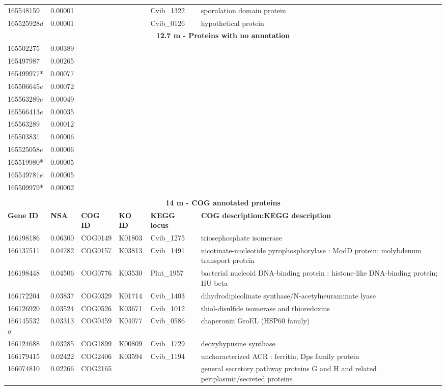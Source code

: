 \begin{landscape}
\begin{longtable}{p{1.6cm}p{1.2cm}p{1.5cm}p{1.5cm}p{2.8cm}p{13.5cm}}
165548159&0.00001&&&Cvib\_1322&sporulation domain protein \\
165525928$d$&0.00001&&&Cvib\_0126&hypothetical protein \\
\multicolumn{6}{c}{\textbf{12.7 m - Proteins with no annotation}} \\
165502275&0.00389&&&& \\
165497987&0.00265&&&& \\
165499977*&0.00077&&&& \\
165506645$e$&0.00072&&&& \\
165563289$e$&0.00049&&&& \\
165566413$e$&0.00035&&&& \\
165563289&0.00012&&&& \\
165503831&0.00006&&&& \\
165525058$e$&0.00006&&&& \\
165519980*&0.00005&&&& \\
165549781$e$&0.00005&&&& \\
165509979*&0.00002&&&& \\
&&&&& \\
\multicolumn{6}{c}{\textbf{14 m - COG annotated proteins}}  \\
\textbf{Gene ID} & \textbf{NSA} & \textbf{COG ID} & \textbf{KO ID} & \textbf{KEGG locus} & \textbf{COG description:KEGG description} \\
166198186&0.06300&COG0149&K01803&Cvib\_1275&triosephosphate isomerase \\
166137511&0.04782&COG0157&K03813&Cvib\_1491&nicotinate-nucleotide pyrophosphorylase : ModD protein; molybdenum transport protein \\
166198448&0.04506&COG0776&K03530&Plut\_1957&bacterial nucleoid DNA-binding protein : histone-like DNA-binding protein; HU-beta \\
166172204&0.03837&COG0329&K01714&Cvib\_1403&dihydrodipicolinate synthase/N-acetylneuraminate lyase \\
166126920&0.03524&COG0526&K03671&Cvib\_1012&thiol-disulfide isomerase and thioredoxins \\
166145532$a$&0.03313&COG0459&K04077&Cvib\_0586&chaperonin GroEL (HSP60 family) \\
166124688&0.03285&COG1899&K00809&Cvib\_1729&deoxyhypusine synthase \\
166179415&0.02422&COG2406&K03594&Cvib\_1194&uncharacterized ACR : ferritin, Dps family protein \\
166074810&0.02266&COG2165&&&general secretory pathway proteins G and H and related periplasmic/secreted proteins \\

\end{longtable}
\end{landscape}
